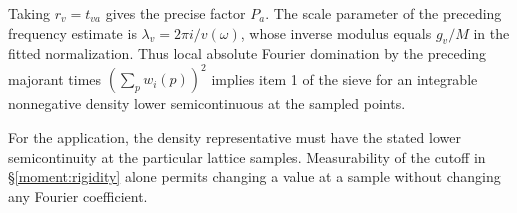 Taking $r_v=t_{va}$ gives the precise factor $P_a$. The scale parameter of the preceding frequency estimate is $\lambda_v=2\pi i/v(\omega)$, whose inverse modulus equals $g_v/M$ in the fitted normalization. Thus local absolute Fourier domination by the preceding majorant times $(\sum_p w_i(p))^2$ implies item 1 of the sieve for an integrable nonnegative density lower semicontinuous at the sampled points.

For the application, the density representative must have the stated
lower semicontinuity at the particular lattice samples. Measurability
of the cutoff in \S\ref{moment:rigidity} alone permits changing a value
at a sample without changing any Fourier coefficient.
